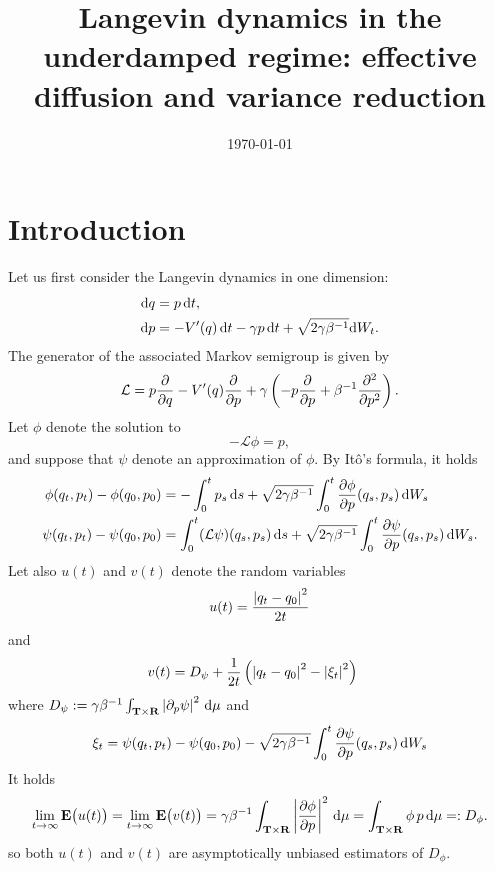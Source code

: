 \documentclass[11pt,a4paper]{article}
\date{\today}
\title{Langevin dynamics in the underdamped regime: effective diffusion and variance reduction }
\author{%
}
\newcommand{\expect}[0]{\mathbf{E}}
\newcommand{\real}{\mathbf R}
\newcommand{\torus}{\mathbf T}
\renewcommand{\d}{\mathrm d}
\theoremstyle{plain}
\numberwithin{equation}{section}
\begin{document}
\maketitle

\section{Introduction}%
Let us first consider the Langevin dynamics in one dimension:
\begin{subequations}
\begin{align}
    \label{eq:Langevin_q}
    \d q &= p \, \d t, \\
    \label{eq:Langevin_p}
    \d p &= - \derivative*{1}[V]{q}(q) \, \d t - \gamma p \, \d t + \sqrt{2 \gamma \beta^{-1}} \d W_t.
\end{align}
\end{subequations}
The generator of the associated Markov semigroup is given by
\[
    \mathcal L = p \derivative{1}{q} - \derivative*{1}[V]{q}(q) \derivative{1}{p} + \gamma \left( - p \derivative{1}{p} + \beta^{-1} \derivative{2}{p^2} \right).
\]
Let $\phi$ denote the solution to
\[
    - \mathcal L \phi = p,
\]
and suppose that $\psi$ denote an approximation of $\phi$.
By It\^o's formula, it holds
\begin{align*}
    \phi(q_t, p_t) - \phi(q_0, p_0) &= - \int_{0}^{t} p_s \, \d s + \sqrt{2 \gamma \beta^{-1}} \int_{0}^{t} \derivative{1}[\phi]{p}(q_s, p_s) \, \d W_s \\
    \psi(q_t, p_t) - \psi(q_0, p_0) &= \int_{0}^{t} (\mathcal L \psi) (q_s, p_s) \, \d s + \sqrt{2 \gamma \beta^{-1}} \int_{0}^{t} \derivative{1}[\psi]{p}(q_s, p_s) \, \d W_s.
\end{align*}
Let also $u(t)$ and $v(t)$ denote the random variables
\[
    u(t) = \frac{\abs{q_t - q_0}^2}{2t}
\]
and
\begin{align*}
    v(t) &= D_{\psi}+ \frac{1}{2t} \left( \abs{q_t - q_0}^2 - \abs{\xi_t}^2\right)
\end{align*}
where $D_{\psi} := \gamma \beta^{-1} \int_{\torus \times \real} \abs{\derivative{1}[\psi]{p}}^2 \, \d \mu$ and
 \[
    \xi_t = \psi(q_t, p_t) - \psi(q_0, p_0) - \sqrt{2 \gamma \beta^{-1}} \int_{0}^{t} \derivative{1}[\psi]{p}(q_s, p_s) \, \d W_s
 \]
It holds
\[
    \lim_{t \to \infty} \expect \bigl( u(t) \bigr) = \lim_{t \to \infty} \expect \bigl( v(t) \bigr)
    = \gamma \beta^{-1} \int_{\torus \times \real} \abs{\derivative{1}[\phi]{p}}^2 \, \d \mu
    = \int_{\torus \times \real} \phi \, p \, \d \mu =: D_{\phi}.
\]
so both $u(t)$ and $v(t)$ are asymptotically unbiased estimators of $D_{\phi}$.
\end{document}
